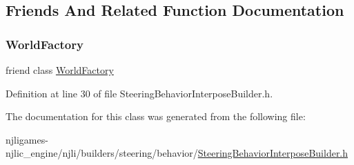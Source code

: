 \subsection{Friends And Related Function Documentation}
\mbox{\label{classnjli_1_1_steering_behavior_interpose_builder_acb96ebb09abe8f2a37a915a842babfac}} 
\subsubsection{\texorpdfstring{World\+Factory}{WorldFactory}}
{\footnotesize\ttfamily friend class \mbox{\hyperlink{classnjli_1_1_world_factory}{World\+Factory}}\hspace{0.3cm}{\ttfamily [friend]}}



Definition at line 30 of file Steering\+Behavior\+Interpose\+Builder.\+h.



The documentation for this class was generated from the following file\+:\begin{DoxyCompactItemize}
\item 
njligames-\/njlic\+\_\+engine/njli/builders/steering/behavior/\mbox{\hyperlink{_steering_behavior_interpose_builder_8h}{Steering\+Behavior\+Interpose\+Builder.\+h}}\end{DoxyCompactItemize}
